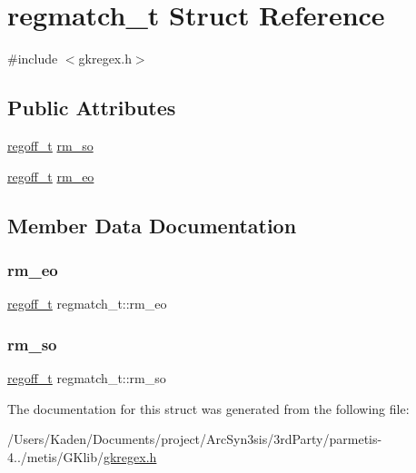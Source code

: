 \hypertarget{a00694}{}\section{regmatch\+\_\+t Struct Reference}
\label{a00694}


{\ttfamily \#include $<$gkregex.\+h$>$}

\subsection*{Public Attributes}
\begin{DoxyCompactItemize}
\item 
\hyperlink{a00092_a5b34995b47432512ee4ffa32b836e65f}{regoff\+\_\+t} \hyperlink{a00694_a90ac8973d256eaffdbb20de676ff45a4}{rm\+\_\+so}
\item 
\hyperlink{a00092_a5b34995b47432512ee4ffa32b836e65f}{regoff\+\_\+t} \hyperlink{a00694_a728c28b9b23fa28c4e0b90e3a1a29efc}{rm\+\_\+eo}
\end{DoxyCompactItemize}


\subsection{Member Data Documentation}
\mbox{\label{a00694_a728c28b9b23fa28c4e0b90e3a1a29efc}} 
\subsubsection{\texorpdfstring{rm\+\_\+eo}{rm\_eo}}
{\footnotesize\ttfamily \hyperlink{a00092_a5b34995b47432512ee4ffa32b836e65f}{regoff\+\_\+t} regmatch\+\_\+t\+::rm\+\_\+eo}

\mbox{\label{a00694_a90ac8973d256eaffdbb20de676ff45a4}} 
\subsubsection{\texorpdfstring{rm\+\_\+so}{rm\_so}}
{\footnotesize\ttfamily \hyperlink{a00092_a5b34995b47432512ee4ffa32b836e65f}{regoff\+\_\+t} regmatch\+\_\+t\+::rm\+\_\+so}



The documentation for this struct was generated from the following file\+:\begin{DoxyCompactItemize}
\item 
/\+Users/\+Kaden/\+Documents/project/\+Arc\+Syn3sis/3rd\+Party/parmetis-\/4../metis/\+G\+Klib/\hyperlink{a00092}{gkregex.\+h}\end{DoxyCompactItemize}
